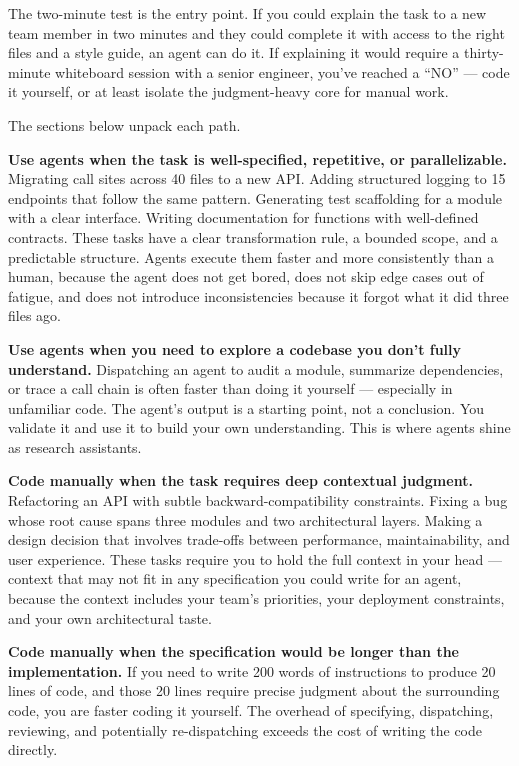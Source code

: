 \documentclass[
  a4paper,
  DIV=11,
  numbers=noendperiod]{scrreprt}
\begin{document}
The two-minute test is the entry point. If you could explain the task to
a new team member in two minutes and they could complete it with access
to the right files and a style guide, an agent can do it. If explaining
it would require a thirty-minute whiteboard session with a senior
engineer, you've reached a ``NO'' --- code it yourself, or at least
isolate the judgment-heavy core for manual work.

The sections below unpack each path.

\textbf{Use agents when the task is well-specified, repetitive, or
parallelizable.} Migrating call sites across 40 files to a new API.
Adding structured logging to 15 endpoints that follow the same pattern.
Generating test scaffolding for a module with a clear interface. Writing
documentation for functions with well-defined contracts. These tasks
have a clear transformation rule, a bounded scope, and a predictable
structure. Agents execute them faster and more consistently than a
human, because the agent does not get bored, does not skip edge cases
out of fatigue, and does not introduce inconsistencies because it forgot
what it did three files ago.

\textbf{Use agents when you need to explore a codebase you don't fully
understand.} Dispatching an agent to audit a module, summarize
dependencies, or trace a call chain is often faster than doing it
yourself --- especially in unfamiliar code. The agent's output is a
starting point, not a conclusion. You validate it and use it to build
your own understanding. This is where agents shine as research
assistants.

\textbf{Code manually when the task requires deep contextual judgment.}
Refactoring an API with subtle backward-compatibility constraints.
Fixing a bug whose root cause spans three modules and two architectural
layers. Making a design decision that involves trade-offs between
performance, maintainability, and user experience. These tasks require
you to hold the full context in your head --- context that may not fit
in any specification you could write for an agent, because the context
includes your team's priorities, your deployment constraints, and your
own architectural taste.

\textbf{Code manually when the specification would be longer than the
implementation.} If you need to write 200 words of instructions to
produce 20 lines of code, and those 20 lines require precise judgment
about the surrounding code, you are faster coding it yourself. The
overhead of specifying, dispatching, reviewing, and potentially
re-dispatching exceeds the cost of writing the code directly.
\end{document}
